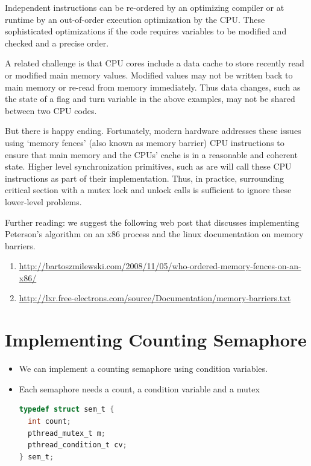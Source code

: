 Independent instructions can be re-ordered by an optimizing compiler or at runtime by an out-of-order execution optimization by the CPU. These sophisticated optimizations if the code requires variables to be modified and checked and a precise order.

A related challenge is that CPU cores include a data cache to store recently read or modified main memory values. Modified values may not be written back to main memory or re-read from memory immediately. Thus data changes, such as the state of a flag and turn variable in the above examples, may not be shared between two CPU codes.

But there is happy ending. Fortunately, modern hardware addresses these issues using `memory fences' (also known as memory barrier) CPU instructions to ensure that main memory and the CPUs' cache is in a reasonable and coherent state. Higher level synchronization primitives, such as  are will call these CPU instructions as part of their implementation. Thus, in practice, surrounding critical section with a mutex lock and unlock calls is sufficient to ignore these lower-level problems.

Further reading: we suggest the following web post that discusses implementing Peterson's algorithm on an x86 process and the linux documentation on memory barriers.
\begin{enumerate}
\item \href{Memory Fences}{http://bartoszmilewski.com/2008/11/05/who-ordered-memory-fences-on-an-x86/}
\item \href{Memory Barriers}{http://lxr.free-electrons.com/source/Documentation/memory-barriers.txt}
\end{enumerate}


\section{Implementing Counting Semaphore}\label{implementing-counting-semaphore}

\begin{itemize}
\item
  We can implement a counting semaphore using condition variables.
\item
  Each semaphore needs a count, a condition variable and a mutex

\begin{lstlisting}[language=C]
typedef struct sem_t {
  int count; 
  pthread_mutex_t m;
  pthread_condition_t cv;
} sem_t;
\end{lstlisting}
\end{itemize}

